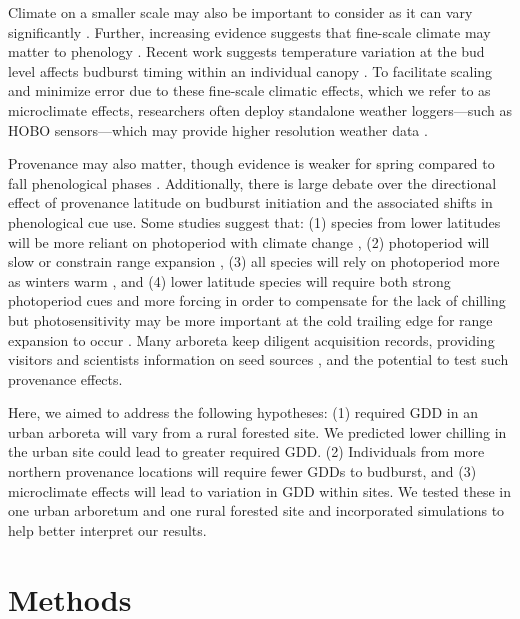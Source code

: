 \documentclass{article}\usepackage[]{graphicx}\usepackage[]{color}
\begin{document}
Climate on a smaller scale may also be important to consider as it can vary significantly \citep[][e.g., as much as 2.6$^{\circ}$C between sensors at the same vineyard or up to 6.6$^{\circ}$C within 1 km spatial units in northern Europe]{Lenoir2013,deResseguier2020}. Further, increasing evidence suggests that fine-scale climate may matter to phenology \citep{Lembrechts2019}. Recent work suggests temperature variation at the bud level affects budburst timing within an individual canopy \citep{Lembrechts2019}. To facilitate scaling and minimize error due to these fine-scale climatic effects, which we refer to as microclimate effects, researchers often deploy standalone weather loggers---such as HOBO sensors---which may provide higher resolution weather data \citep{Schwartz2013a,Whiteman2000}. 
 
Provenance may also matter, though evidence is weaker for spring compared to fall phenological phases \citep{McKown2013, Aitken2015, Vico2021}. Additionally, there is large debate over the directional effect of provenance latitude on budburst initiation and the associated shifts in phenological cue use. Some studies suggest that: (1) species from lower latitudes will be more reliant on photoperiod with climate change \citep{Zohner2016}, (2) photoperiod will slow or constrain range expansion \citep{Saikkonen2012}, (3) all species will rely on photoperiod more as winters warm \citep{Way2015}, and (4) lower latitude species will require both strong photoperiod cues and more forcing in order to compensate for the lack of chilling but photosensitivity may be more important at the cold trailing edge for range expansion to occur \citep{Gauzere2017}. Many arboreta keep diligent acquisition records, providing visitors and scientists information on seed sources \citep{Dosmann2006}, and the potential to test such provenance effects.

Here, we aimed to address the following hypotheses: (1) required GDD in an urban arboreta will vary from a rural forested site. We predicted lower chilling in the urban site could lead to greater required GDD. (2) Individuals from more northern provenance locations will require fewer GDDs to budburst, and (3) microclimate effects will lead to variation in GDD within sites. We tested these in one urban arboretum and one rural forested site and incorporated simulations to help better interpret our results. 

\section*{Methods}
\end{document}
